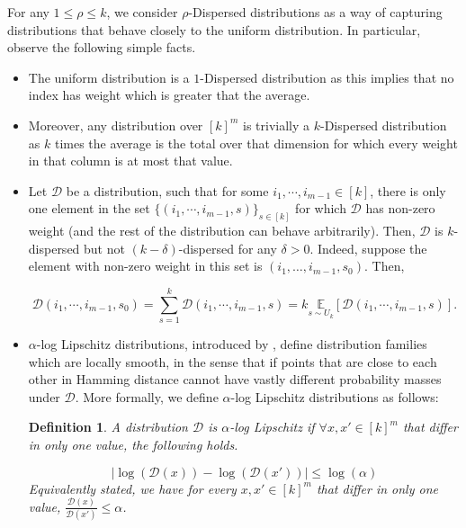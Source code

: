 \documentclass[10pt,a4paper]{article}
\newtheorem{definition}{Definition}[section]
\newcommand{\sD}{\mathcal{D}}
\begin{document}
For any $1 \leq \rho \leq k$, we consider $\rho$-Dispersed distributions as a way of capturing distributions that behave closely to the uniform distribution. In particular, observe the following simple facts.
\begin{itemize}
    \item The uniform distribution is a $1$-Dispersed distribution as this implies that no index has weight which is greater that the average.
    \item  Moreover, any distribution over $[k]^{m}$ is trivially a $k$-Dispersed distribution as $k$ times the average is the total over that dimension for which every weight in that column is at most that value. 
    \item Let $\sD$ be a distribution, such that for some $i_{1},\cdots, i_{m-1}\in [k]$, there is only one element in the set $\{(i_{1},\cdots, i_{m-1},s)\}_{s\in [k]}$ for which $\sD$ has non-zero weight (and the rest of the distribution can behave arbitrarily). Then, $\sD$ is $k$-dispersed but not $(k-\delta)$-dispersed for any $\delta>0$. Indeed, suppose the element with non-zero weight in this set is $(i_1, \dots, i_{m-1},s_{0})$. Then, 
    
    \begin{equation*}
    \sD(i_{1},\cdots, i_{m-1},s_{0})=\sum_{s=1}^{k}\sD(i_{1},\cdots, i_{m-1},s)=k\underset{s\sim U_{k}}{\mathbb{E}}[\sD(i_{1},\cdots, i_{m-1},s)].
    \end{equation*}
    
    \item $\alpha$-log Lipschitz distributions, introduced by \cite{AFK13}, define distribution families which are locally smooth, in the sense that if points that are close to each other in Hamming distance cannot have vastly different probability masses under $\sD$. More formally, we define $\alpha$-log Lipschitz distributions as follows:

    \begin{definition}
    A distribution $\sD$ is $\alpha$-log Lipschitz if $\forall x,x'\in [k]^{m}$ that differ in only one value, the following holds.

    \begin{equation*}
        |\log(\sD(x))-\log(\sD(x'))|\leq \log (\alpha)
    \end{equation*}
    Equivalently stated, we have for every $x,x'\in [k]^{m}$ that differ in only one value, $\frac{\sD(x)}{\sD(x')}\leq \alpha$.
    \end{definition}


\end{itemize}
\end{document}
